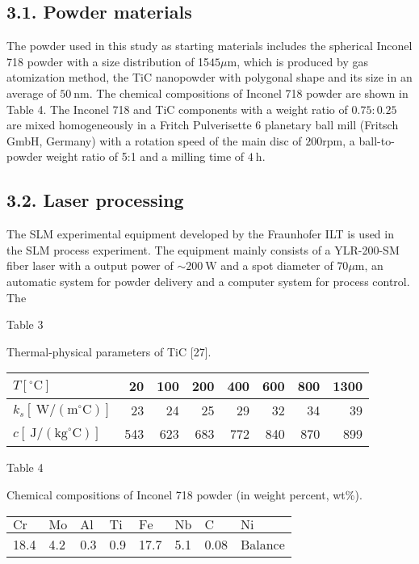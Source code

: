 \documentclass[10pt]{article}
\begin{document}
\subsection*{3.1. Powder materials}
The powder used in this study as starting materials includes the spherical Inconel 718 powder with a size distribution of 15$45 \mu \mathrm{m}$, which is produced by gas atomization method, the TiC nanopowder with polygonal shape and its size in an average of $50 \mathrm{~nm}$. The chemical compositions of Inconel 718 powder are shown in Table 4. The Inconel 718 and TiC components with a weight ratio of $0.75: 0.25$ are mixed homogeneously in a Fritch Pulverisette 6 planetary ball mill (Fritsch GmbH, Germany) with a rotation speed of the main disc of $200 \mathrm{rpm}$, a ball-to-powder weight ratio of 5:1 and a milling time of $4 \mathrm{~h}$.

\subsection*{3.2. Laser processing}
The SLM experimental equipment developed by the Fraunhofer ILT is used in the SLM process experiment. The equipment mainly consists of a YLR-200-SM fiber laser with a output power of $\sim 200 \mathrm{~W}$ and a spot diameter of $70 \mu \mathrm{m}$, an automatic system for powder delivery and a computer system for process control. The

Table 3

Thermal-physical parameters of TiC [27].

\begin{center}
\begin{tabular}{lrrrrrrr}
\hline
$T\left[{ }^{\circ} \mathrm{C}\right]$ & 20 & 100 & 200 & 400 & 600 & 800 & 1300 \\
\hline
$k_{s}\left[\mathrm{~W} /\left(\mathrm{m}^{\circ} \mathrm{C}\right)\right]$ & 23 & 24 & 25 & 29 & 32 & 34 & 39 \\
$c\left[\mathrm{~J} /\left(\mathrm{kg}^{\circ} \mathrm{C}\right)\right]$ & 543 & 623 & 683 & 772 & 840 & 870 & 899 \\
\hline
\end{tabular}
\end{center}

Table 4

Chemical compositions of Inconel 718 powder (in weight percent, wt\%).

\begin{center}
\begin{tabular}{llllllll}
\hline
$\mathrm{Cr}$ & $\mathrm{Mo}$ & $\mathrm{Al}$ & $\mathrm{Ti}$ & $\mathrm{Fe}$ & $\mathrm{Nb}$ & $\mathrm{C}$ & $\mathrm{Ni}$ \\
\hline
18.4 & 4.2 & 0.3 & 0.9 & 17.7 & 5.1 & 0.08 & Balance \\
\hline
\end{tabular}
\end{center}
\end{document}
